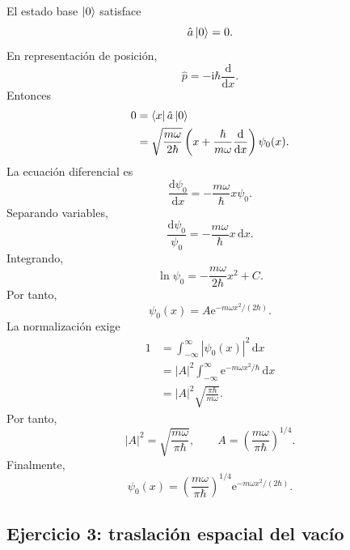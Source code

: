\documentclass[11pt]{article}
\newcommand{\ii}{\mathrm{i}}
\newcommand{\ee}{\mathrm{e}}
\newcommand{\dd}{\mathrm{d}}
\begin{document}
El estado base $\ket0$ satisface
\begin{equation}
  \hat a\ket0=0.
\end{equation}
En representaci\'on de posici\'on,
\begin{equation}
  \hat p=-\ii\hbar\frac{\dd}{\dd x}.
\end{equation}
Entonces
\begin{align}
  0
  &=
  \bra{x}\hat a\ket0\\
  &=
  \sqrt{\frac{m\omega}{2\hbar}}
  \left(
  x+\frac{\hbar}{m\omega}\frac{\dd}{\dd x}
  \right)\psi_0(x).
\end{align}
La ecuaci\'on diferencial es
\begin{equation}
  \frac{\dd\psi_0}{\dd x}
  =
  -\frac{m\omega}{\hbar}x\psi_0.
\end{equation}
Separando variables,
\begin{equation}
  \frac{\dd\psi_0}{\psi_0}
  =
  -\frac{m\omega}{\hbar}x\,\dd x.
\end{equation}
Integrando,
\begin{equation}
  \ln\psi_0
  =
  -\frac{m\omega}{2\hbar}x^2+C.
\end{equation}
Por tanto,
\begin{equation}
  \psi_0(x)=A\ee^{-m\omega x^2/(2\hbar)}.
\end{equation}
La normalizaci\'on exige
\begin{align}
  1
  &=
  \int_{-\infty}^{\infty}|\psi_0(x)|^2\,\dd x\\
  &=
  |A|^2
  \int_{-\infty}^{\infty}
  \ee^{-m\omega x^2/\hbar}\,\dd x\\
  &=
  |A|^2\sqrt{\frac{\pi\hbar}{m\omega}}.
\end{align}
Por tanto,
\begin{equation}
  |A|^2=\sqrt{\frac{m\omega}{\pi\hbar}},
  \qquad
  A=\left(\frac{m\omega}{\pi\hbar}\right)^{1/4}.
\end{equation}
Finalmente,
\begin{equation}
  \boxed{
  \psi_0(x)
  =
  \left(\frac{m\omega}{\pi\hbar}\right)^{1/4}
  \ee^{-m\omega x^2/(2\hbar)}.
  }
\end{equation}

\subsection*{Ejercicio 3: traslaci\'on espacial del vac\'io}
\end{document}
